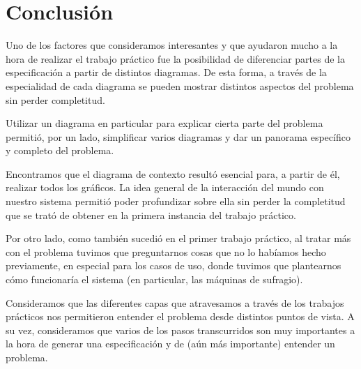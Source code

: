\documentclass[spanish, 10pt,a4paper]{article}
\numberwithin{equation}{section} %
\begin{document}
\section{Conclusión}
	Uno de los factores que consideramos interesantes y que ayudaron mucho a la hora de realizar el trabajo práctico fue la posibilidad de diferenciar partes de la especificación a partir de distintos diagramas. De esta forma, a través de la especialidad de cada diagrama se pueden mostrar distintos aspectos del problema sin perder completitud. 
\par
Utilizar un diagrama en particular para explicar cierta parte del problema permitió, por un lado, simplificar varios diagramas y dar un panorama específico y completo del problema. 
\par
 Encontramos que el diagrama de contexto resultó esencial para, a partir de él, realizar todos los gráficos. La idea general de la interacción del mundo con nuestro sistema permitió poder profundizar sobre ella sin perder la completitud que se trató de obtener en la primera instancia del trabajo práctico.
\par
 Por otro lado, como también sucedió en el primer trabajo práctico, al tratar más con el problema tuvimos que preguntarnos cosas que no lo habíamos hecho previamente, en especial para los casos de uso, donde tuvimos que plantearnos cómo funcionaría el sistema (en particular, las máquinas de sufragio).
\par
 Consideramos que las diferentes capas que atravesamos a través de los trabajos prácticos nos permitieron entender el problema desde distintos puntos de vista. A su vez, consideramos que varios de los pasos transcurridos son muy importantes a la hora de generar una especificación y de (aún más importante) entender un problema.

\end{document}
